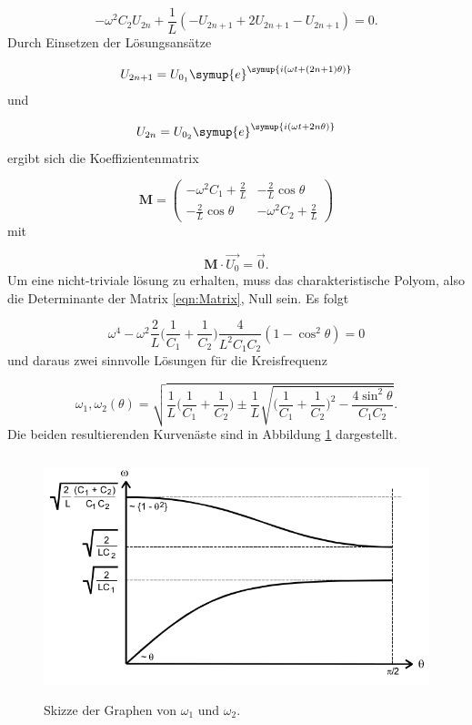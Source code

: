 \begin{equation}
  -\omega^2 C_2 U_{2n} + \frac{1}{L}(-U_{2n+1}+2U_{2n+1}-U_{2n+1}) = 0.
\end{equation}
Durch Einsetzen der Lösungsansätze

\begin{equation}
  U_{2n+1} = U_{0_1} \symup{e}^{\symup{i(\omega t + (2n+1)\theta)}}
\end{equation}
und

\begin{equation}
  U_{2n} = U_{0_2} \symup{e}^{\symup{i(\omega t + 2n\theta)}}
\end{equation}
ergibt sich die Koeffizientenmatrix

\begin{equation}
  \symbf{M} =
  \begin{pmatrix}
    -\omega^2 C_1 + \frac{2}{L} & -\frac{2}{L} \cos \theta \\
    -\frac{2}{L} \cos \theta & -\omega^2 C_2 + \frac{2}{L}
  \end{pmatrix}
  \label{eqn:Matrix}
\end{equation}
mit

\begin{equation}
  \symbf{M} \cdot \vec{U_0} = \vec{0}.
\end{equation}
Um eine nicht-triviale lösung zu erhalten, muss das charakteristische Polyom,
also die Determinante der Matrix \eqref{eqn:Matrix}, Null sein.
Es folgt

\begin{equation}
  \omega^4 - \omega^2 \frac{2}{L} \biggl(\frac{1}{C_1} + \frac{1}{C_2}\biggr)
  \frac{4}{L^2 C_1 C_2} (1 - \cos^2 \theta) = 0
\end{equation}
und daraus zwei sinnvolle Lösungen für die Kreisfrequenz \omega

\begin{equation}
  \omega_1, \omega_2 (\theta) = \sqrt{\frac{1}{L} \biggl(\frac{1}{C_1} +
  \frac{1}{C_2}\biggr)
  \pm \frac{1}{L} \sqrt{\biggl(\frac{1}{C_1} + \frac{1}{C_2}\biggr)^2 -
  \frac{4 \sin^2 \theta}{C_1C_2}}}.
  \label{eqn:Omega}
\end{equation}
Die beiden resultierenden Kurvenäste sind in Abbildung \ref{fig:KurveLC1C2}
dargestellt.

\begin{figure}
  \centering
  \includegraphics[height=7cm]{KurveLC1C2.png}
  \caption{Skizze der Graphen von $\omega_1$ und $\omega_2$.}
  \label{fig:KurveLC1C2}
\end{figure}

